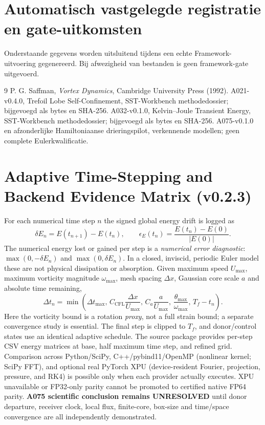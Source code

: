 \documentclass[10pt,a4paper]{article}
\begin{document}
\section{Automatisch vastgelegde registratie en gate-uitkomsten}
Onderstaande gegevens worden uitsluitend tijdens een echte Framework-uitvoering gegenereerd.
Bij afwezigheid van bestanden is geen framework-gate uitgevoerd.
\begin{thebibliography}{9}
 P. G. Saffman, \emph{Vortex Dynamics}, Cambridge University Press (1992).
 A021-v0.4.0, Trefoil Lobe Self-Confinement, SST-Workbench methodedossier; bijgevoegd als bytes en SHA-256.
 A032-v0.1.0, Kelvin--Joule Transient Energy, SST-Workbench methodedossier; bijgevoegd als bytes en SHA-256.
 A075-v0.1.0 en afzonderlijke Hamiltoniaanse drieringspilot, verkennende modellen; geen complete Eulerkwalificatie.
\end{thebibliography}

\section{Adaptive Time-Stepping and Backend Evidence Matrix (v0.2.3)}
For each numerical time step $n$ the signed global energy drift is logged as
\begin{equation}
\delta E_n=E(t_{n+1})-E(t_n),\qquad
\epsilon_E(t_n)=\frac{E(t_n)-E(0)}{|E(0)|}.
\end{equation}
The numerical energy lost or gained per step is a \emph{numerical error diagnostic}:
$\max(0,-\delta E_n)$ and $\max(0,\delta E_n)$. In a closed, inviscid,
periodic Euler model these are not physical dissipation or absorption.
Given maximum speed $U_{\max}$, maximum vorticity magnitude $\omega_{\max}$,
mesh spacing $\Delta x$, Gaussian core scale $a$ and absolute time remaining,
\begin{equation}
\Delta t_n=\min\left(\Delta t_{\max},\,
C_{\mathrm{CFL}}\frac{\Delta x}{U_{\max}},\,
C_a\frac{a}{U_{\max}},\,
\frac{\theta_{\max}}{\omega_{\max}},\,T_f-t_n\right).
\end{equation}
Here the vorticity bound is a rotation \emph{proxy}, not a full strain bound;
a separate convergence study is essential. The final step is clipped to $T_f$,
and donor/control states use an identical adaptive schedule.
The source package provides per-step CSV energy matrices at base,
half maximum time step, and refined grid. Comparison across Python/SciPy,
C++/pybind11/OpenMP (nonlinear kernel; SciPy FFT), and optional real
PyTorch XPU (device-resident Fourier, projection, pressure, and RK4) is
possible only when each provider actually executes. XPU unavailable or
FP32-only parity cannot be promoted to certified native FP64 parity.
\textbf{A075 scientific conclusion remains UNRESOLVED} until donor departure,
receiver clock, local flux, finite-core, box-size and time/space convergence
are all independently demonstrated.
\end{document}
